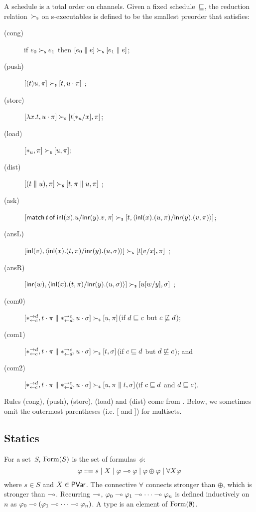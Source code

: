 A schedule is a total order on channels.
Given a fixed schedule~$\sche$, the reduction relation~$\sred$
on s-executables
is defined to be the smallest preorder
that satisfies:
\begin{description}
 \item[(cong)] if
      $e_0         \sred e_1$
      then
      $[e_0 \conc e] \sred [e_1\conc e]$\enspace;
 \item[(push)]
	    $[(t)u,\pi]      \sred [t,u\cdot\pi]$      \enspace;
 \item[(store)]
	    $[\lambda x.t,u\cdot\pi]
	     \sred
	     [t[\ast_u/x],      \pi]$\enspace;
 \item[(load)]
	    $[\ast_u,\pi]\sred [u,\pi]$\enspace;
 \item[(dist)]
           $[(t\conc u),\pi]  \sred [t,\pi\conc u,\pi]$ \enspace;
 \item[(ask)]
      $[\mat t x u y v,\pi]\sred [t,\mats x u \pi y v \pi]$\enspace;
 \item[(ansL)]
           $[\inl{v}, \mats xt\pi yu\sigma] \sred [t[v/x],\pi] $ \enspace;
 \item[(ansR)]
           $[\inr{w}, \mats xt\pi yu\sigma] \sred [u[w/y],\sigma] $ \enspace;
 \item[(com0)]
           $[\comod c{d}, t\cdot\pi\conc \comod{d}c,
           u\cdot\sigma] \sred
           [u,\pi]$\enspace(if $d\sche c$ but $c\not\sche d$)\enspace;
 \item[(com1)]
	    $[\comod c{d}, t\cdot\pi\conc \comod{d}c,
	    u\cdot\sigma] \sred
	    [t,\sigma]$\enspace(if $c\sche d$ but $d\not\sche c$)\enspace; and
 \item[(com2)]
	    $[\comod c{d}, t\cdot\pi\conc \comod{d}c,
	    u\cdot\sigma] \sred
	    [u,\pi\conc t,\sigma]$\enspace(if $c\sche d$ and $d\sche
       c$)\enspace.
\end{description}
Rules (cong), (push), (store), (load) and (dist) come from \citet{danos-krivine}.
Below, we sometimes omit the outermost parentheses (i.e. [ and ]) for multisets.



\subsection{Statics}
For a set~$S$,
$\form(S)$ is the set of formulas~$\phi$:
\[
\phi::= s \mid X \mid \phi\limp\phi\mid \phi\oplus\phi\mid
\forall X \phi
\]
where $s\in S$ and $X\in \pvar$.
The connective $\forall$ connects stronger than $\oplus$, which is
stronger than $\limp$.
Recurring $\limp$,
$\phi_0\limp\phi_1\limp\cdots\limp\phi_n$ is defined inductively on~$n$
as
$\phi_0\limp(\phi_1\limp\cdots\limp\phi_n)$.
A type is an element of $\form(\emptyset)$.

